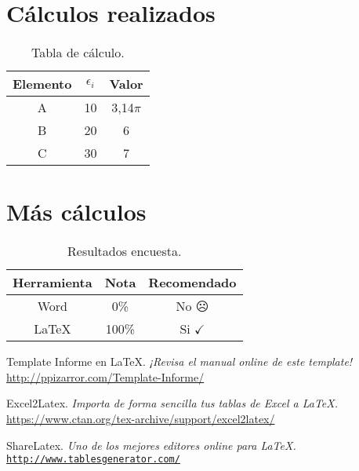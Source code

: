 \newpage
\begin{anexo}
	\section{Cálculos realizados}
	
		\lipsum[69]
		
		
		\lipsum[10]
		
		\begin{table}[htbp]
			\centering
			\caption{Tabla de cálculo.}
			\begin{tabular}{ccc}
				\hline
				\textbf{Elemento} & $\epsilon_i$ & \boldmath{}\textbf{Valor}\unboldmath{} \bigstrut\\
				\hline
				A     & 10    & 3,14$\pi$ \bigstrut[t]\\
				B     & 20    & 6 \\
				C     & 30    & 7 \\
				\end{tabular}
			\label{tab:anexo-1}
		\end{table}
	
	\newpage
	\section{Más cálculos}
	
		\lipsum[1]\newp\lipsum[4]
		
		\begin{table}[htbp]
			\centering
			\caption{Resultados encuesta.}
			\begin{tabular}{ccc}
				\hline
				\textbf{Herramienta} & \textbf{Nota} & \textbf{Recomendado} \bigstrut\\
				\hline
				Word  & 0\%   & No $\frownie$\\
				\LaTeX & 100\% & Si $\checkmark$ \\
			\end{tabular}
			\label{tab:anexo-2}
		\end{table}
		
\end{anexo}

\newpage %
\begin{references}
	Template Informe en \LaTeX.
	\textit{¡Revisa el manual online de este template!} \\
	\url{http://ppizarror.com/Template-Informe/}
	
	Excel2Latex.
	\textit{Importa de forma sencilla tus tablas de Excel a \LaTeX.} \\
	\url{https://www.ctan.org/tex-archive/support/excel2latex/}
	
	ShareLatex.
	\textit{Uno de los mejores editores online para \LaTeX.} \\
	\href{https://www.sharelatex.com/?r=298b935f&rm=d&rs=b}{\texttt{http://www.tablesgenerator.com/}}
\end{references}
